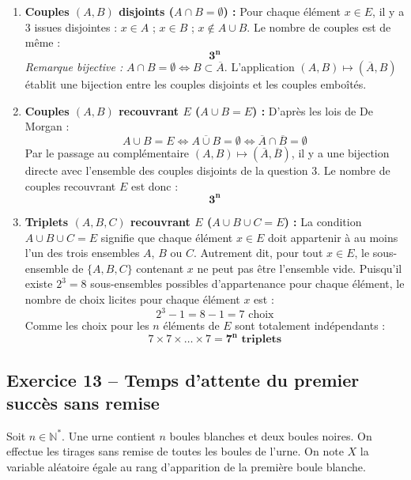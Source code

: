 \documentclass[11pt,a4paper]{article}
\newcommand{\N}{\mathbb{N}}
\begin{document}
\begin{correctionbox}
\begin{enumerate}[label=\arabic*.]
    \item \textbf{Couples $(A, B)$ disjoints ($A \cap B = \emptyset$) :}
    Pour chaque élément $x \in E$, il y a 3 issues disjointes : $x \in A$ ; $x \in B$ ; $x \notin A \cup B$.
    Le nombre de couples est de même :
    \[
    \mathbf{3^n}
    \]
    \emph{Remarque bijective :} $A \cap B = \emptyset \iff B \subset \overline{A}$. L'application $(A, B) \mapsto (\overline{A}, B)$ établit une bijection entre les couples disjoints et les couples emboîtés.

    \item \textbf{Couples $(A, B)$ recouvrant $E$ ($A \cup B = E$) :}
    D'après les lois de De Morgan :
    \[
    A \cup B = E \iff \overline{A \cup B} = \emptyset \iff \overline{A} \cap \overline{B} = \emptyset
    \]
    Par le passage au complémentaire $(A, B) \mapsto (\overline{A}, \overline{B})$, il y a une bijection directe avec l'ensemble des couples disjoints de la question 3. Le nombre de couples recouvrant $E$ est donc :
    \[
    \mathbf{3^n}
    \]

    \item \textbf{Triplets $(A, B, C)$ recouvrant $E$ ($A \cup B \cup C = E$) :}
    La condition $A \cup B \cup C = E$ signifie que chaque élément $x \in E$ doit appartenir à au moins l'un des trois ensembles $A$, $B$ ou $C$.
    Autrement dit, pour tout $x \in E$, le sous-ensemble de $\{A, B, C\}$ contenant $x$ ne peut pas être l'ensemble vide.
    Puisqu'il existe $2^3 = 8$ sous-ensembles possibles d'appartenance pour chaque élément, le nombre de choix licites pour chaque élément $x$ est :
    \[
    2^3 - 1 = 8 - 1 = 7\text{ choix}
    \]
    Comme les choix pour les $n$ éléments de $E$ sont totalement indépendants :
    \[
    7 \times 7 \times \dots \times 7 = \mathbf{7^n\text{ triplets}}
    \]
\end{enumerate}
\end{correctionbox}

\vspace{0.3cm}

\subsection*{Exercice 13 -- Temps d'attente du premier succès sans remise}

Soit $n \in \N^*$. Une urne contient $n$ boules blanches et deux boules noires. On effectue les tirages sans remise de toutes les boules de l'urne.
On note $X$ la variable aléatoire égale au rang d'apparition de la première boule blanche.
\end{document}

